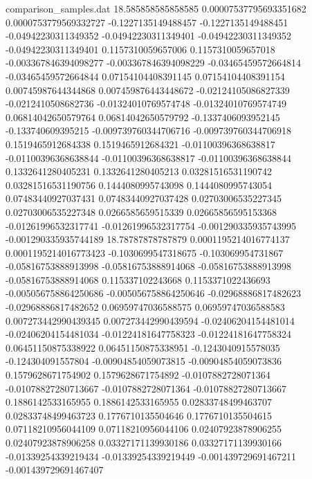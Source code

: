 \begin{filecontents}{comparison_samples.dat}
18.585858585858585  0.00007537795693351682  0.0000753779569332727   -0.1227135149488457    -0.1227135149488451    -0.04942230311349352   -0.04942230311349401   -0.04942230311349352   -0.04942230311349401   0.1157310059657006     0.1157310059657018     -0.003367846394098277   -0.003367846394098229   -0.03465459572664814   -0.03465459572664844   0.07154104408391145     0.07154104408391154     0.00745987644344868     0.007459876443448672    -0.02124105086827339    -0.0212410508682736     -0.01324010769574748    -0.01324010769574749    0.06814042650579764     0.06814042650579792     -0.1337406093952145     -0.133740609395215      -0.009739760344706716  -0.009739760344706918  0.1519465912684338     0.1519465912684321     -0.01100396368638817    -0.01100396368638844    -0.01100396368638817    -0.01100396368638844    0.1332641280405231     0.1332641280405213     0.03281516531190742     0.03281516531190756     0.1444080995743098     0.1444080995743054     0.07483440927037431     0.07483440927037428     0.02703006535227345     0.02703006535227348     0.0266585659515339     0.02665856595153368    -0.01261996532317741   -0.01261996532317754   -0.001290335935743995   -0.001290335935744189 
18.78787878787879   0.0001195214016774137   0.0001195214016773423   -0.1030699547318675    -0.103069954731867     -0.05816753888913998   -0.05816753888914068   -0.05816753888913998   -0.05816753888914068   0.115337102243668      0.1153371022436693     -0.005056758864250686   -0.005056758864250646   -0.02968886817482623   -0.02968886817482652   0.06959747036588575     0.06959747036588583     0.007273442990439345    0.007273442990439594    -0.02406204154481014    -0.02406204154481034    -0.01224181647758323    -0.01224181647758324    0.06451150875338922     0.06451150875338951     -0.1243040915578035     -0.124304091557804      -0.00904854059073815   -0.00904854059073836   0.1579628671754902     0.1579628671754892     -0.0107882728071364     -0.01078827280713667    -0.0107882728071364     -0.01078827280713667    0.1886142533165955     0.1886142533165955     0.02833748499463707     0.02833748499463723     0.1776710135504646     0.1776710135504615     0.07118210956044109     0.07118210956044106     0.02407923878906255     0.02407923878906258     0.03327171139930186    0.03327171139930166    -0.01339254339219434   -0.01339254339219449   -0.001439729691467211   -0.001439729691467407 

\end{filecontents}
